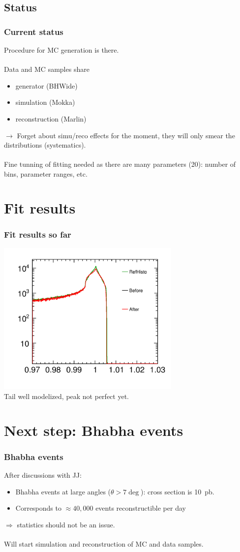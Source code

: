 \documentclass[handout]{beamer}
\begin{document}
\subsection{Status}
\begin{frame}
\frametitle{Current status}
Procedure for MC generation is there.\\
~\\
Data and MC samples share 
\begin{itemize}
  \item generator (BHWide)
  \item simulation (Mokka)
  \item reconstruction (Marlin)
\end{itemize}
$\to$ Forget about simu/reco effects for the moment, they will only smear
the distributions (systematics).\\
~\\
Fine tunning of fitting needed as there are many parameters (20): number of
bins, parameter ranges, etc.
\end{frame}


\section{Fit results}
\begin{frame}
\frametitle{Fit results so far}
\centering
\includegraphics[width=9cm]{HistoGrams}\\
Tail well modelized, peak not perfect yet.
\end{frame}

\section{Next step: Bhabha events}
\begin{frame}
\frametitle{Bhabha events}
After discussions with JJ:
\begin{itemize}
  \item Bhabha events at large angles ($\theta > 7\deg$): cross section is
  10~pb.
  \item Corresponds to $\approx 40,000$ events reconstructible per day
\end{itemize}
$\Rightarrow$ statistics should not be an issue.\\
~\\
Will start simulation and reconstruction of MC and data samples.
\end{frame}
\end{document}

